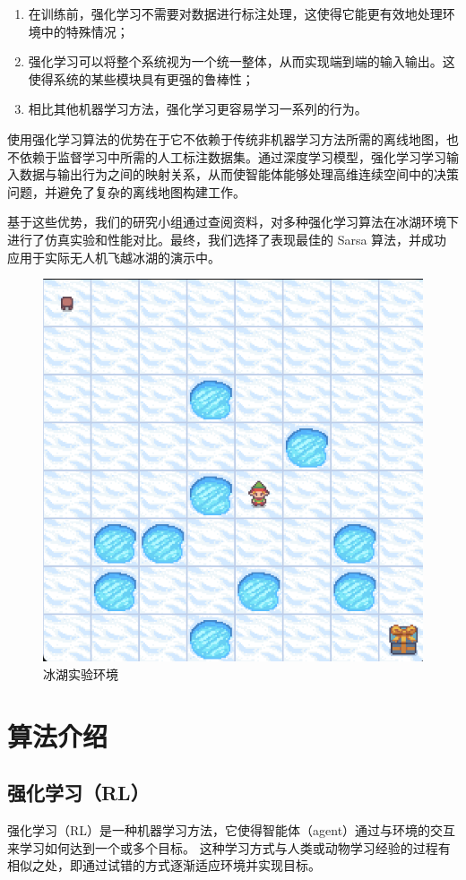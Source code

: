 \documentclass{thuemp}
\begin{document}
\begin{enumerate}
  \item 在训练前，强化学习不需要对数据进行标注处理，这使得它能更有效地处理环境中的特殊情况；
  \item 强化学习可以将整个系统视为一个统一整体，从而实现端到端的输入输出。这使得系统的某些模块具有更强的鲁棒性；
  \item 相比其他机器学习方法，强化学习更容易学习一系列的行为。
\end{enumerate}
  
使用强化学习算法的优势在于它不依赖于传统非机器学习方法所需的离线地图，也不依赖于监督学习中所需的人工标注数据集。通过深度学习模型，强化学习学习输入数据与输出行为之间的映射关系，从而使智能体能够处理高维连续空间中的决策问题，并避免了复杂的离线地图构建工作。
  
基于这些优势，我们的研究小组通过查阅资料，对多种强化学习算法在冰湖环境下进行了仿真实验和性能对比。最终，我们选择了表现最佳的 Sarsa 算法，并成功应用于实际无人机飞越冰湖的演示中。
\begin{figure}[H]
  \centering
  \includegraphics[width=0.8\linewidth]{./img/icelake1.png}
  \caption{冰湖实验环境}
\end{figure}



\section{算法介绍}
\subsection{强化学习（RL）}
强化学习（RL）是一种机器学习方法，它使得智能体（agent）通过与环境的交互来学习如何达到一个或多个目标。
这种学习方式与人类或动物学习经验的过程有相似之处，即通过试错的方式逐渐适应环境并实现目标。
\end{document}
